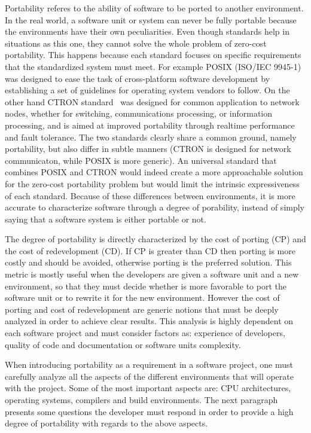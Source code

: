 \documentclass[12pt,a4paper]{report}
\begin{document}
Portability referes to the ability of software to be ported to another
environment. In the real world, a software unit or system can never be fully portable because the
environments have their own peculiarities. Even though standards help in situations as this one,
they cannot solve the whole problem of zero-cost portability. This happens because each standard
focuses on specific requirements that the standardized system must meet. For example POSIX
(ISO/IEC 9945-1) was designed to ease the task of cross-platform software development by
establishing a set of guidelines for operating system vendors to follow. On the other hand CTRON
standard~\cite{wasano1989application} was designed for common application to network nodes, whether
for switching, communications
processing, or information processing, and is aimed at improved portability through realtime
performance and fault tolerance. The two standards clearly share a common ground, namely portability,
but also differ in subtle manners (CTRON is designed for network communicaton, while POSIX is more
generic). An universal standard that combines POSIX and CTRON would indeed create a more approachable
solution for the zero-cost portability problem but would limit the intrinsic expressiveness of
each standard. Because of these differences between environments, it is more accurate to characterize
software through a degree of porability, instead of simply saying that a software system is either
portable or not.

The degree of portability is directly characterized by the cost of porting (CP) and the cost of
redevelopment (CD). If CP is greater than CD then porting is more costly and should be avoided,
otherwise porting is the preferred solution. This metric is mostly useful when the developers are
given a software unit and a new environment, so that they must decide whether is more favorable
to port the software unit or to rewrite it for the new environment. However the cost of porting
and cost of redevelopment are generic notions that must be deeply analyzed in order to achieve
clear results. This analysis is highly dependent on each software project and must consider
factors as: experience of developers, quality of code and documentation or software units
complexity.

When introducing portability as a requirement in a software project, one must carefully analyze all
the aspects of the different environments that will operate with the project. Some of the most
important aspects are: CPU architectures, operating systems, compilers and build environments.
The next paragraph presents some questions the developer must respond in order to provide a high
degree of portability with regards to the above aspects.
\end{document}
